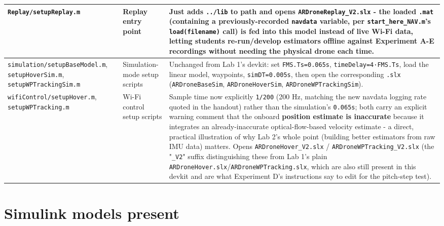 \documentclass[11pt]{article}
\begin{document}
\begin{center}
\begin{longtable}{|p{3.0cm}|p{4.2cm}|p{7.0cm}|}
\hline
\texttt{Replay/\allowbreak{}setupReplay.m} & Replay entry point & Just adds \texttt{../lib} to path and opens \texttt{ARDroneReplay\_\allowbreak{}V2.slx} - the loaded \texttt{.mat} (containing a previously-recorded \texttt{navdata} variable, per \texttt{start\_\allowbreak{}here\_\allowbreak{}NAV.m}'s \texttt{load(filename)} call) is fed into this model instead of live Wi-Fi data, letting students re-run/develop estimators offline against Experiment A-E recordings without needing the physical drone each time. \\
\hline
\texttt{simulation/\allowbreak{}setupBaseModel.m}, \texttt{setupHoverSim.m}, \texttt{setupWPTrackingSim.m} & Simulation-mode setup scripts & Unchanged from Lab 1's devkit: set \texttt{FMS.Ts=0.065s}, \texttt{timeDelay=4·FMS.Ts}, load the linear model, waypoints, \texttt{simDT=0.005s}, then open the corresponding \texttt{.slx} (\texttt{ARDroneBaseSim}, \texttt{ARDroneHoverSim}, \texttt{ARDroneWPTrackingSim}). \\
\hline
\texttt{wifiControl/\allowbreak{}setupHover.m}, \texttt{setupWPTracking.m} & Wi-Fi control setup scripts & Sample time now explicitly \texttt{1/200} (200 Hz, matching the new navdata logging rate quoted in the handout) rather than the simulation's \texttt{0.065s}; both carry an explicit warning comment that the onboard \textbf{position estimate is inaccurate} because it integrates an already-inaccurate optical-flow-based velocity estimate - a direct, practical illustration of why Lab 2's whole point (building better estimators from raw IMU data) matters. Opens \texttt{ARDroneHover\_\allowbreak{}V2.slx} / \texttt{ARDroneWPTracking\_\allowbreak{}V2.slx} (the "\texttt{\_\allowbreak{}V2}" suffix distinguishing these from Lab 1's plain \texttt{ARDroneHover.slx}/\texttt{ARDroneWPTracking.slx}, which are also still present in this devkit and are what Experiment D's instructions say to edit for the pitch-step test). \\
\hline
\end{longtable}
\end{center}

\section{Simulink models present}
\end{document}
